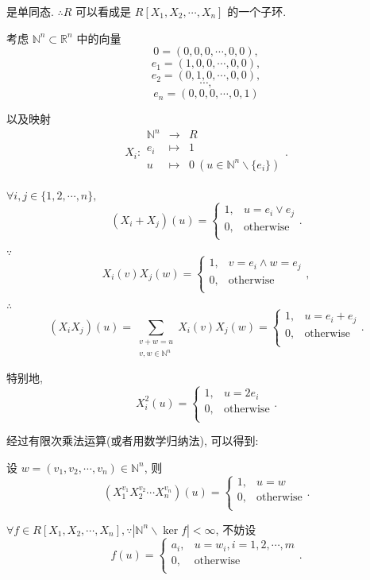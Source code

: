 \documentclass[color=black,device=normal,lang=cn,mode=geye]{elegantnote}
\begin{document}
是单同态. $\therefore R$ 可以看成是 $R[X_1,X_2,\cdots,X_n]$ 的一个子环.

考虑 $\mathbb{N}^n\subset\mathbb{R}^n$ 中的向量
\[0=(0,0,0,\cdots,0,0),\]
\[e_1=(1,0,0,\cdots,0,0),\]
\[e_2=(0,1,0,\cdots,0,0),\]
\[\cdots,\]
\[e_n=(0,0,0,\cdots,0,1)\]

以及映射
\[X_i:\begin{array}{rcl}
    \mathbb{N}^n & \to & R \\
    e_i & \mapsto & 1 \\
    u & \mapsto & 0\ (u\in\mathbb{N}^n\backslash\{e_i\}) \\
\end{array}.\]

$\forall i,j\in\{1,2,\cdots,n\},$
\[(X_i+X_j)(u)=\begin{cases}
    1, & u=e_i\vee e_j \\
    0, & \text{otherwise} \\
\end{cases}.\]

$\because$
\[X_i(v)X_j(w)=\begin{cases}
    1, & v=e_i\land w=e_j \\
    0, & \text{otherwise} \\
\end{cases},\]

$\therefore$
\[(X_iX_j)(u)=\sum\limits_{\substack{v+w=u\\v,w\in\mathbb{N}^n}}X_i(v)X_j(w)
=\begin{cases}
    1, & u=e_i+e_j \\
    0, & \text{otherwise} \\
\end{cases}.\]

特别地,
\[X_i^2(u)=\begin{cases}
    1, & u=2e_i \\
    0, & \text{otherwise} \\
\end{cases}.\]

经过有限次乘法运算(或者用数学归纳法), 可以得到:

设 $w=(v_1,v_2,\cdots,v_n)\in\mathbb{N}^n$, 则
\[(X_1^{v_1}X_2^{v_2}\cdots X_n^{v_n})(u)=\begin{cases}
    1, & u=w \\
    0, & \text{otherwise} \\
\end{cases}.\]

$\forall f\in R[X_1,X_2,\cdots,X_n],\because|\mathbb{N}^n\backslash\ker f|<\infty$, 不妨设
\[f(u)=\begin{cases}
    a_i, & u=w_i,i=1,2,\cdots,m \\
    0, & \text{otherwise} \\
\end{cases}.\]
\end{document}
